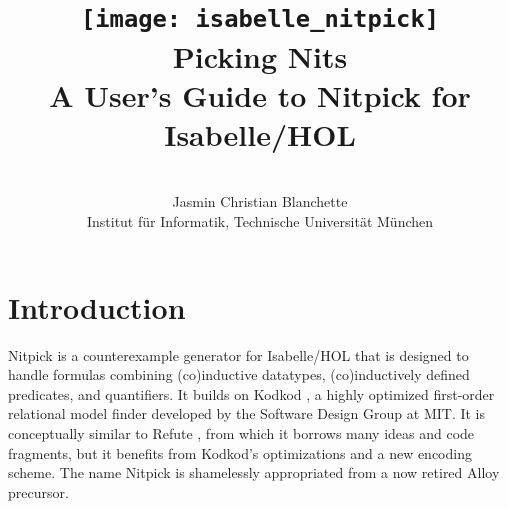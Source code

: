 \documentclass[a4paper,12pt]{article}
\begin{document}

\title{\texttt{[image: isabelle\_nitpick]} \\[4ex]
Picking Nits \\[\smallskipamount]
\Large A User's Guide to Nitpick for Isabelle/HOL}
\author{\hbox{} \\
Jasmin Christian Blanchette \\
{\normalsize Institut f\"ur Informatik, Technische Universit\"at M\"unchen} \\
\hbox{}}

\maketitle

\tableofcontents

\setlength{\parskip}{.7em plus .2em minus .1em}
\setlength{\parindent}{0pt}
\setlength{\abovedisplayskip}{\parskip}
\setlength{\abovedisplayshortskip}{.9\parskip}
\setlength{\belowdisplayskip}{\parskip}
\setlength{\belowdisplayshortskip}{.9\parskip}

\newenvironment{enum}%
    {\begin{list}{}{%
        \setlength{\topsep}{.1\parskip}%
        \setlength{\partopsep}{.1\parskip}%
        \setlength{\itemsep}{\parskip}%
        \advance\itemsep by-\parsep}}
    {\end{list}}

\def\pre{\begingroup\vskip0pt plus1ex\advance\leftskip by\leftmargin
\advance\rightskip by\leftmargin}
\def\post{\vskip0pt plus1ex\endgroup}

\def\prew{\pre\advance\rightskip by-\leftmargin}
\def\postw{\post}

\section{Introduction}
\label{introduction}

Nitpick \cite{blanchette-nipkow-2010} is a counterexample generator for
Isabelle/HOL \cite{isa-tutorial} that is designed to handle formulas
combining (co)in\-duc\-tive datatypes, (co)in\-duc\-tively defined predicates, and
quantifiers. It builds on Kodkod \cite{torlak-jackson-2007}, a highly optimized
first-order relational model finder developed by the Software Design Group at
MIT. It is conceptually similar to Refute \cite{weber-2008}, from which it
borrows many ideas and code fragments, but it benefits from Kodkod's
optimizations and a new encoding scheme. The name Nitpick is shamelessly
appropriated from a now retired Alloy precursor.
\end{document}
